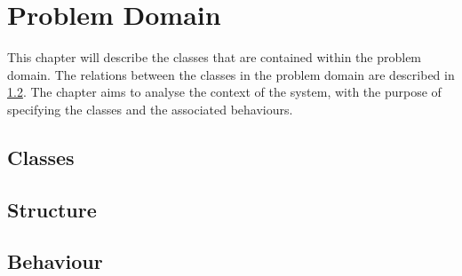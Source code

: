 \chapter{Problem Domain}
\label{problemDomain}
This chapter will describe the classes that are contained within the problem domain. The relations between the classes in the problem domain are described in \cref{sub:Structure}. The chapter aims to analyse the context of the system, with the purpose of specifying the classes and the associated behaviours.

\section{Classes}
\label{sub:pd_classes}


\section{Structure}
\label{sub:Structure}


\section{Behaviour}

